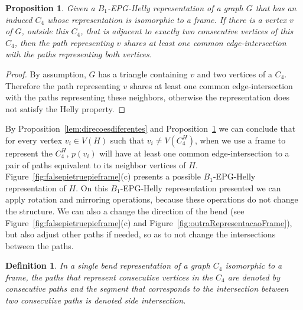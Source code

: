 \documentclass[preprint,12pt]{elsarticle} %
\newtheorem{defi}[theorem]{Definition}
\newtheorem{prop}[theorem]{Proposition}
\begin{document}
\begin{prop}\label{lem:mesmaretasuporte}
Given a $B_1$-EPG-Helly representation of a graph $G$ that has an induced $C_4$ whose representation is isomorphic to a frame. If there is a vertex $v$ of $G$, outside this $C_4$, that is adjacent to exactly two consecutive vertices of this $C_4$, then the path representing $v$ shares at least one common edge-intersection with the paths representing both vertices.%
\end{prop}

\begin{proof}
By assumption, $G$ has a triangle containing $v$ and two vertices of a $C_4$. Therefore the path representing $v$ shares at least one common edge-intersection with the paths representing these neighbors, otherwise the representation does not satisfy the Helly property.
\end{proof}


By Proposition~\ref{lem:direcoesdiferentes} and Proposition~\ref{lem:mesmaretasuporte} we can conclude that for every vertex $v_i \in V(H)$ such that $v_i \neq V(C_4^{H})$, when we use a frame to represent the $C_4^{H}$, $p(v_i)$ will have at least one common edge-intersection to a pair of paths equivalent to its neighbor vertices of $H$. %
Figure~\ref{fig:falsepietruepieframe}(c) presents a possible $B_{1}$-EPG-Helly representation of $H$. On this $B_{1}$-EPG-Helly representation presented we can apply rotation and mirroring operations, because these operations do not change the structure. We can also a change the direction of the bend (see Figure~\ref{fig:falsepietruepieframe}(c) and Figure~\ref{fig:outraRepresentacaoFrame}), but also adjust other paths if needed, so as to not change the intersections between the paths.

\begin{defi}
In a single bend representation of a graph $C_4$ isomorphic to a frame, the paths that represent consecutive vertices in the $C_4$ are denoted by \emph{consecutive paths} and the segment that corresponds to the intersection between two consecutive paths is denoted \emph{side intersection}.  
\end{defi}
\end{document}

